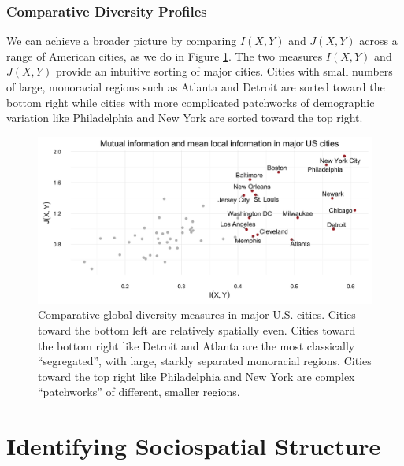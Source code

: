 \documentclass[english]{scrartcl}
\begin{document}
		\subsubsection{Comparative Diversity Profiles}

			We can achieve a broader picture by comparing $I(X,Y)$ and $J(X,Y)$ across a range of American cities, as we do in Figure \ref{fig:mutual_fisher}. The two measures $I(X,Y)$ and $J(X,Y)$ provide an intuitive sorting of major cities. Cities with small numbers of large, monoracial regions such as Atlanta and Detroit are sorted toward the bottom right while cities with more complicated patchworks of demographic variation like Philadelphia and New York are sorted toward the top right. 

			\begin{figure}
				\includegraphics[width=\textwidth]{figs/mutual_fisher.png}
				\caption{Comparative global diversity measures in major U.S. cities. Cities toward the bottom left are relatively spatially even. Cities toward the bottom right like Detroit and Atlanta are the most classically ``segregated'', with large, starkly separated monoracial regions. Cities toward the top right like Philadelphia and New York are complex ``patchworks'' of different, smaller regions.} \label{fig:mutual_fisher}
			\end{figure}


\section{Identifying Sociospatial Structure} \label{sec:id}
\end{document}

